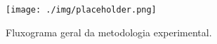 \begin{figure}[htb]
	\label{fig:rectification}
	\caption{Fluxograma geral da metodologia experimental.}
	\begin{center}
	    \texttt{[image: ./img/placeholder.png]}
	\end{center}
\end{figure}
